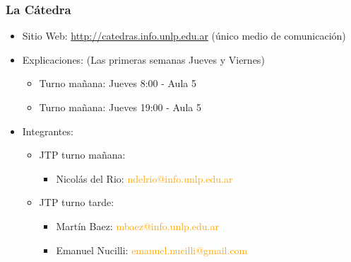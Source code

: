 \begin{frame}
  \frametitle{La Cátedra}
  \begin{itemize}
	  \item Sitio Web: \textcolor{orange}{\url{http://catedras.info.unlp.edu.ar}} (único medio de comunicación)
	  \item Explicaciones: (Las primeras semanas Jueves y Viernes)
	  \begin{itemize}
	  	\item Turno mañana: Jueves 8:00 - Aula 5
	  	\item Turno mañana: Jueves 19:00 - Aula 5
	  \end{itemize}
	  \item Integrantes:
	  \begin{itemize}
	  	\item JTP turno mañana:
	  	\begin{itemize}
	  		\item Nicolás del Rio: \textcolor{orange}{ndelrio@info.unlp.edu.ar}
	  	\end{itemize}
	  	\item JTP turno tarde:
	  	\begin{itemize}
	  		\item Martín Baez: \textcolor{orange}{mbaez@info.unlp.edu.ar}
	  		\item Emanuel Nucilli: \textcolor{orange}{emanuel.nucilli@gmail.com}
	  	\end{itemize}  	
	  \end{itemize}
  \end{itemize}
  \begin{table}
	      \centering
  \end{table}
\end{frame}

